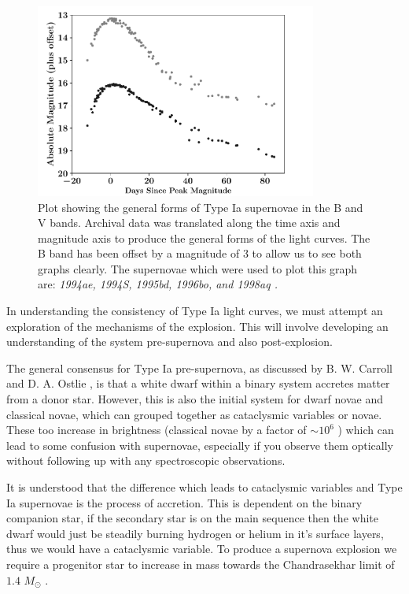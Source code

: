 \documentclass[twocolumn]{revtex4}
\newcommand{\squeezeup}{\vspace{-2.5mm}}
\begin{document}
\squeezeup
\begin{figure}[!h]
\begin{center}
\includegraphics[width=9.25cm]{intro/typeia}
\caption[]{Plot showing the general forms of Type Ia supernovae in the B and V bands. Archival data was translated along the time axis and magnitude axis to produce the general forms of the light curves. The B band has been offset by a magnitude of $3$ to allow us to see both graphs clearly. The supernovae which were used to plot this graph are: \em{1994ae, 1994S, 1995bd, 1996bo, }\em  and \em{1998aq }\em \cite{jha, matheson}. }
\label{typeia-standard}
\end{center}
\end{figure}

In understanding the consistency of Type Ia light curves, we must attempt an exploration of the mechanisms of the explosion. This will involve developing an understanding of the system pre-supernova and also post-explosion.

The general consensus for Type Ia pre-supernova, as discussed by B. W. Carroll and D. A. Ostlie \cite{mod_ast}, is that a white dwarf within a binary system accretes matter from a donor star. However, this is also the initial system for dwarf novae and classical novae, which can grouped together as cataclysmic variables or novae. These too increase in brightness (classical novae by a factor of $\sim 10^6$ \cite{mod_ast}) which can lead to some confusion with supernovae, especially if you observe them optically without following up with any spectroscopic observations. 

It is understood that the difference which leads to cataclysmic variables and Type Ia supernovae is the process of accretion. This is dependent on the binary companion star, if the secondary star is on the main sequence then the white dwarf would just be steadily burning hydrogen or helium in it's surface layers, thus we would have a cataclysmic variable. To produce a supernova explosion we require a progenitor star to increase in mass towards the Chandrasekhar limit of $1.4$ $M_{\odot}$ \cite{posn, longair}. 
\end{document}
